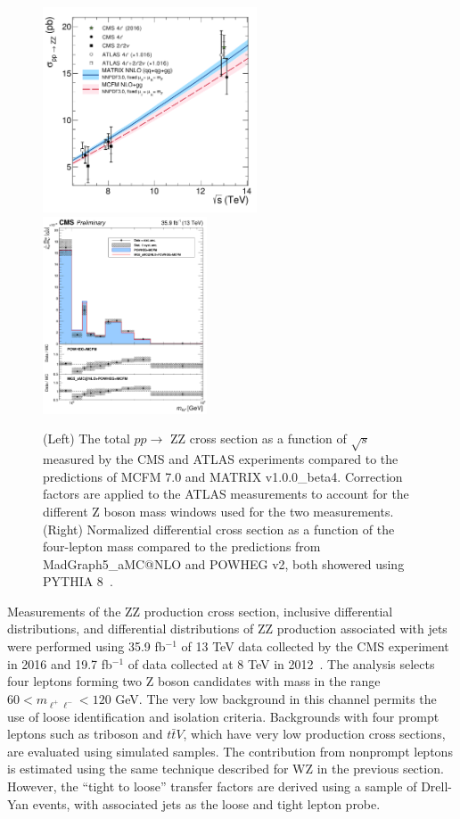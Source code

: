 \documentclass[10pt]{article}
\begin{document}
\begin{figure}[htb]
  \centering
    \includegraphics[height=2.4in]{figures/ZZCrossSection_vs_sqrtS.pdf}
    \includegraphics[height=2.3in]{figures/ZZ_13TeV_mZZ_unfolded.pdf}
    \caption{ (Left) The total $pp \rightarrow$ ZZ cross section
      as a function of $\sqrt{s}$ measured by the CMS and 
      ATLAS experiments compared to the predictions of \textsc{MCFM} 7.0 and \textsc{MATRIX} v1.0.0\_beta4. 
      Correction factors are applied to the ATLAS measurements to account
      for the different Z boson mass windows used for the two measurements.
      (Right) Normalized differential cross section as a function
      of the four-lepton mass compared to the predictions from
      MadGraph5\_aMC@NLO and \textsc{POWHEG} v2, both showered using \textsc{PYTHIA} 8~\cite{CMS:2017ruh}.
      }
  \label{fig:ZZinclusive}
\end{figure}

Measurements of the ZZ production cross section, inclusive differential distributions,
and differential distributions of ZZ production associated with jets
were performed using 35.9 fb$^{-1}$ of 13 TeV data collected by the CMS experiment in 2016
\cite{CMS:2017ruh}\cite{CMS-PAS-SMP-16-019}
and 19.7 fb$^{-1}$ of data collected at 8 TeV in 2012~\cite{CMS-PAS-SMP-15-012}. 
The analysis selects four leptons forming two 
Z boson candidates with
mass in the range $60 < m_{\ell^{+}\ell^{-}} < 120$ GeV. The very low background
in this channel permits the use of loose identification and isolation criteria. 
Backgrounds with four prompt leptons such as triboson and $t\bar{t}V$, 
which have very
low production cross sections, are evaluated using simulated samples. The 
contribution from nonprompt leptons is estimated using the same technique
described for WZ in the previous section. However, the ``tight to loose'' transfer 
factors are derived using a sample of Drell-Yan events, with associated 
jets as the loose and tight lepton probe.
\end{document}
